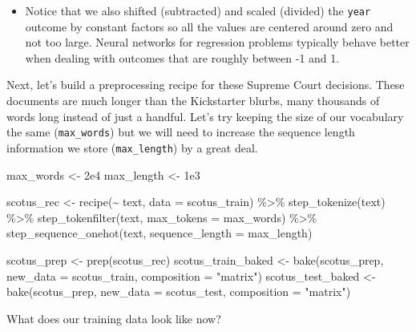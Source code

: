 \documentclass[
]{krantz}
\makeatletter
\newenvironment{Shaded}{\begin{snugshade}}{\end{snugshade}}
\newcommand{\AttributeTok}[1]{\textcolor[rgb]{0.77,0.63,0.00}{#1}}
\newcommand{\FloatTok}[1]{\textcolor[rgb]{0.00,0.00,0.81}{#1}}
\newcommand{\FunctionTok}[1]{\textcolor[rgb]{0.00,0.00,0.00}{#1}}
\newcommand{\NormalTok}[1]{#1}
\newcommand{\OtherTok}[1]{\textcolor[rgb]{0.56,0.35,0.01}{#1}}
\newcommand{\SpecialCharTok}[1]{\textcolor[rgb]{0.00,0.00,0.00}{#1}}
\newcommand{\StringTok}[1]{\textcolor[rgb]{0.31,0.60,0.02}{#1}}
\newenvironment{kframe}{%
\medskip{}
\setlength{\fboxsep}{.8em}
 \def\at@end@of@kframe{}%
 \ifinner\ifhmode%
  \def\at@end@of@kframe{\end{minipage}}%
  \begin{minipage}{\columnwidth}%
 \fi\fi%
 \def\FrameCommand##1{\hskip\@totalleftmargin \hskip-\fboxsep
 \colorbox{shadecolor}{##1}\hskip-\fboxsep
     \hskip-\linewidth \hskip-\@totalleftmargin \hskip\columnwidth}%
 \MakeFramed {\advance\hsize-\width
   \@totalleftmargin\z@ \linewidth\hsize
   \@setminipage}}%
 {\par\unskip\endMakeFramed%
 \at@end@of@kframe}
\renewenvironment{Shaded}{\begin{kframe}}{\end{kframe}}
\newenvironment{rmdblock}[1]
  {\begin{shaded*}
  \begin{itemize}[left = -1cm, labelsep = 1cm]
  \renewcommand{\labelitemi}{
    \raisebox{-.7\height}[0pt][0pt]{
      {\setkeys{Gin}{width=3em,keepaspectratio}\texttt{[image: images/\#1]}}
    }
  }
 
  \item
  }
  {
  \end{itemize}
  \end{shaded*}
  }
\newenvironment{rmdwarning}
  {\begin{rmdblock}{warning}}
  {\end{rmdblock}}
\makeatother
\begin{document}
\begin{rmdwarning}
Notice that we also shifted (subtracted) and scaled (divided) the
\texttt{year} outcome by constant factors so all the values are centered
around zero and not too large. Neural networks for regression problems
typically behave better when dealing with outcomes that are roughly
between -1 and 1.
\end{rmdwarning}

Next, let's build a preprocessing recipe for these Supreme Court decisions. These documents are much longer than the Kickstarter blurbs, many thousands of words long instead of just a handful. Let's try keeping the size of our vocabulary the same (\texttt{max\_words}) but we will need to increase the sequence length information we store (\texttt{max\_length}) by a great deal.

\begin{Shaded}
\begin{Highlighting}[]
\NormalTok{max\_words }\OtherTok{\textless{}{-}} \FloatTok{2e4}
\NormalTok{max\_length }\OtherTok{\textless{}{-}} \FloatTok{1e3}

\NormalTok{scotus\_rec }\OtherTok{\textless{}{-}} \FunctionTok{recipe}\NormalTok{(}\SpecialCharTok{\textasciitilde{}}\NormalTok{ text, }\AttributeTok{data =}\NormalTok{ scotus\_train) }\SpecialCharTok{\%\textgreater{}\%}
  \FunctionTok{step\_tokenize}\NormalTok{(text) }\SpecialCharTok{\%\textgreater{}\%}
  \FunctionTok{step\_tokenfilter}\NormalTok{(text, }\AttributeTok{max\_tokens =}\NormalTok{ max\_words) }\SpecialCharTok{\%\textgreater{}\%}
  \FunctionTok{step\_sequence\_onehot}\NormalTok{(text, }\AttributeTok{sequence\_length =}\NormalTok{ max\_length)}

\NormalTok{scotus\_prep }\OtherTok{\textless{}{-}} \FunctionTok{prep}\NormalTok{(scotus\_rec)}
\NormalTok{scotus\_train\_baked }\OtherTok{\textless{}{-}} \FunctionTok{bake}\NormalTok{(scotus\_prep,}
                           \AttributeTok{new\_data =}\NormalTok{ scotus\_train,}
                           \AttributeTok{composition =} \StringTok{"matrix"}\NormalTok{)}
\NormalTok{scotus\_test\_baked }\OtherTok{\textless{}{-}} \FunctionTok{bake}\NormalTok{(scotus\_prep,}
                          \AttributeTok{new\_data =}\NormalTok{ scotus\_test,}
                          \AttributeTok{composition =} \StringTok{"matrix"}\NormalTok{)}
\end{Highlighting}
\end{Shaded}

What does our training data look like now?
\end{document}
